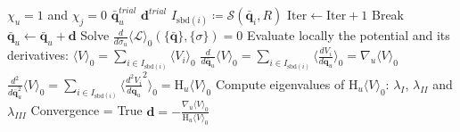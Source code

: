 \documentclass{article}
\newcommand\meanfield[1]{\langle{#1}\rangle_0}
\begin{document}
    \begin{algorithm}
    \caption{Energy barrier algorithm between sites $i$ and $j$ (Newton-Raphson)}\label{alg:Energy-barrier}
    \begin{algorithmic}
    \Require 
    \State $\chi_u = 1$ and $\chi_j = 0$ 
    \State $\bar{\mathbf{q}}_u^{trial}$ 
    \State $\mathbf{d}^{trial}$   
    \State $I_{\text{sbd}(i)} \coloneqq \mathcal{S}(\bar{\mathbf{q}}_i,R) $ 
    \vspace{0.5cm}  
    \State $\text{Iter} \gets \text{Iter} + 1$   \vspace{0.5cm}  
        \State Break 
    \Else
        \State $\bar{\mathbf{q}}_u \gets \bar{\mathbf{q}}_u + \mathbf{d}$      \vspace{0.5cm}
        \State Solve $\frac{d}{d \sigma_u} \meanfield{\mathcal{L}}(\{\bar{\mathbf{q}}\},\{\sigma\}) = 0$   \vspace{0.5cm}
        \State Evaluate locally the potential and its derivatives:     \vspace{0.5cm}
        \State $\meanfield{V} = \sum_{i\in{I_{\text{sbd}(i)}}} \meanfield{V_i}$   \vspace{0.5cm}
        \State $\frac{d}{d \bar{\mathbf{q}}_u} \meanfield{V} = \sum_{i\in{I_{\text{sbd}(i)}}} \meanfield{\frac{d V_i}{d \mathbf{q}_u}} = \nabla_u \meanfield{V}$  \vspace{0.5cm}
        \State $\frac{d^2}{d \bar{\mathbf{q}}_u^2} \meanfield{V} = \sum_{i\in{I_{\text{sbd}(i)}}} \meanfield{\frac{d^2 V_i}{d \mathbf{q}_u}^2} = \text{H}_u \meanfield{V}$     \vspace{0.5cm}    
        \If{$\parallel \nabla_u \meanfield{V} \parallel \leq \textit{Tol}$}
            \State Compute eigenvalues of $\text{H}_u \meanfield{V}$: $\lambda_{I}$, $\lambda_{II}$ and $\lambda_{III}$ \vspace{0.5cm} 
                \State Convergence = True
            \EndIf
        \EndIf   \vspace{0.5cm}  
           \State $\mathbf{d} = - \frac{\nabla_u \meanfield{V}}{\text{H}_u \meanfield{V}}$  
        \EndIf  \vspace{0.5cm}  
    \EndIf
    \EndWhile
    \end{algorithmic}
    \end{algorithm}
    
\end{document}
